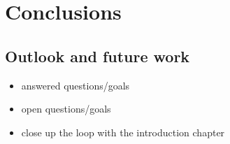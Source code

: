\chapter{Conclusions}
\label{chp:outlook}

\section{Outlook and future work}

\begin{itemize}
\itemsep0em
  \item answered questions/goals
  \item open questions/goals
  \item close up the loop with the introduction chapter
\end{itemize}

